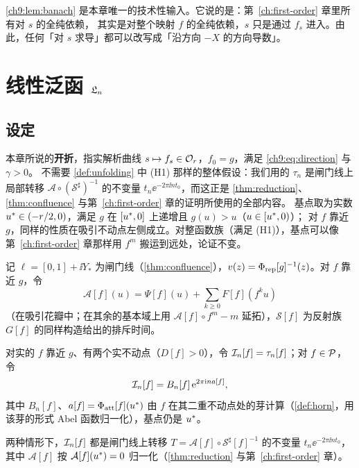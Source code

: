 \begin{remark}
\cref{ch9:lem:banach} 是本章唯一的技术性输入。它说的是：第~\ref{ch:first-order} 章里所有对 $s$ 的全纯依赖，
其实是对整个映射 $f$ 的全纯依赖，$s$ 只是通过 $f_s$ 进入。由此，任何「对 $s$ 求导」都可以改写成「沿方向 $-X$ 的方向导数」。
\end{remark}

\section{线性泛函 \texorpdfstring{$\mathfrak L_n$}{L\_n}}\label{ch9:sec:linear}

\subsection{设定}
本章所说的\textbf{开折}，指实解析曲线 $s\mapsto f_s\in\mathcal O_r$，$f_0=g$，满足 \eqref{ch9:eq:direction} 与 $\gamma>0$。
不需要 \cref{def:unfolding} 中 (H1) 那样的整体假设：我们用的 $\tau_n$ 是闸门线上局部转移 $\mathcal A\circ(\mathcal S^\sharp)^{-1}$ 的不变量
$t_n\ee^{-2\pi\ii nt_0}$，而这正是 \cref{thm:reduction}、\cref{thm:confluence} 与第~\ref{ch:first-order} 章的证明所使用的全部内容。
基点取为实数 $u^{*}\in(-r/2,0)$，满足 $g$ 在 $[u^{*},0]$ 上递增且 $g(u)>u$（$u\in[u^{*},0)$）；
对 $f$ 靠近 $g$，同样的性质在吸引不动点左侧成立。对整函数族（满足 (H1)），基点可以像第~\ref{ch:first-order} 章那样用 $f^m$ 搬运到远处，论证不变。

记 $\ell=[0,1]+\ii Y_*$ 为闸门线（\cref{thm:confluence}），$v(z)=\Phi_{\mathrm{rep}}[g]^{-1}(z)$。对 $f$ 靠近 $g$，令
\[
 \mathcal A[f](u)=\Psi[f](u)+\sum_{k\ge0}F[f](f^ku)
\]
（在吸引花瓣中；在其余的基本域上用 $\mathcal A[f]\circ f^m-m$ 延拓），$\mathcal S[f]$ 为反射族 $G[f]$ 的同样构造给出的排斥时间。

\begin{definition}\label{ch9:def:invariant}
对实的 $f$ 靠近 $g$、有两个实不动点（$D[f]>0$），令 $\mathcal I_n[f]=\tau_n[f]$；对 $f\in\mathcal P$，令
\[
 \mathcal I_n[f]=B_n[f]\,\mathrm{e}^{2\pi\mathrm{i} na[f]},
\]
其中 $B_n[f]$、$a[f]=\Phi_{\mathrm{att}}[f](u^{*})$ 由 $f$ 在其二重不动点处的芽计算（\cref{def:horn}，用该芽的形式 Abel 函数归一化），基点仍是 $u^{*}$。
\end{definition}

两种情形下，$\mathcal I_n[f]$ 都是闸门线上转移 $T=\mathcal A[f]\circ\mathcal S^\sharp[f]^{-1}$ 的不变量 $t_n\ee^{-2\pi\ii nt_0}$，
其中 $\mathcal A[f]$ 按 $\mathcal A[f](u^{*})=0$ 归一化（\cref{thm:reduction} 与第~\ref{ch:first-order} 章）。

